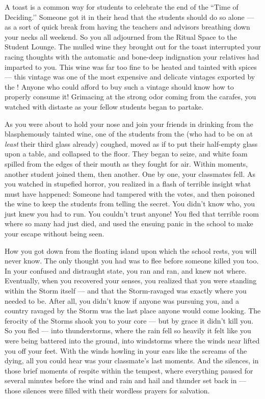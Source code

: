 \documentclass[char]{GL2020}
\begin{document}
A toast is a common way for students to celebrate the end of the ``Time of Deciding.’’ Someone got it in their head that the students should do so alone — as a sort of quick break from having the teachers and advisors breathing down your necks all weekend. So you all adjourned from the Ritual Space to the Student Lounge. The mulled wine they brought out for the toast interrupted your racing thoughts with the automatic and bone-deep indignation your \pFarm{} relatives had imparted to you. This wine was far too fine to be heated and tainted with spices — this vintage was one of the most expensive and delicate vintages exported by the \pFarm{}! Anyone who could afford to buy such a vintage should know how to properly consume it! Grimacing at the strong odor coming from the carafes, you watched with distaste as your fellow students began to partake.

As you were about to hold your nose and join your friends in drinking from the blasphemously tainted wine, one of the students from the \pFarm{} (who had to be on at \emph{least} their third glass already) coughed, moved as if to put their half-empty glass upon a table, and collapsed to the floor. They began to seize, and white foam spilled from the edges of their mouth as they fought for air. Within moments, another student joined them, then another. One by one, your classmates fell. As you watched in stupefied horror, you realized in a flash of terrible insight what must have happened: Someone had tampered with the votes, and then poisoned the wine to keep the students from telling the secret. You didn't know who, you just knew you had to run. You couldn't trust anyone! You fled that terrible room where so many had just died, and used the ensuing panic in the school to make your escape without being seen.

How you got down from the floating island upon which the school rests, you will never know. The only thought you had was to flee before someone killed you too. In your confused and distraught state, you ran and ran, and knew not where. Eventually, when you recovered your senses, you realized that you were standing within the Storm itself — and that the Storm-ravaged \pShip{} was exactly where you needed to be. After all, you didn't know if anyone was pursuing you, and a country ravaged by the Storm was the last place anyone would come looking. The ferocity of the Storms shook you to your core — but by \cFarmGod{\intros} grace it didn't kill you. So you fled — into thunderstorms, where the rain fell so heavily it felt like you were being battered into the ground, into windstorms where the winds near lifted you off your feet. With the winds howling in your ears like the screams of the dying, all you could hear was your classmate's last moments. And the silences, in those brief moments of respite within the tempest, where everything paused for several minutes before the wind and rain and hail and thunder set back in — those silences were filled with their wordless prayers for salvation.
\end{document}
